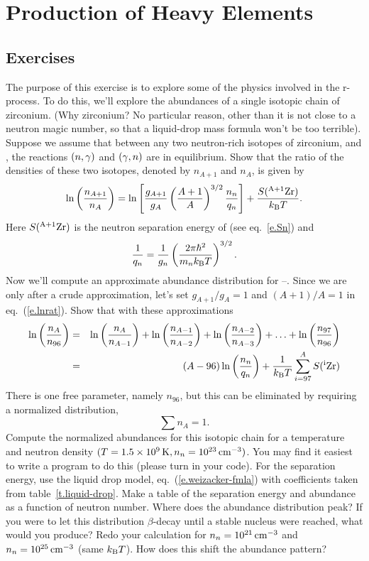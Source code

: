 \chapter{Production of Heavy Elements}

\section{Exercises}
The purpose of this exercise is to explore some of the physics involved in the r-process.  To do this, we'll explore the abundances of a single isotopic chain of zirconium.  (Why zirconium? No particular reason, other than it is not close to a neutron magic number, so that a liquid-drop mass formula won't be too terrible).  Suppose we assume that between any two neutron-rich isotopes of zirconium, \zirconium[A+1] and \zirconium[A], the reactions $(\nt,\gamma)$ and $(\gamma,\nt)$ are in equilibrium.  Show that the ratio of the densities of these two isotopes, denoted by $n_{A+1}$ and $n_{A}$, is given by
\begin{equation}\label{e.lnrat}
	\ln\left(\frac{n_{A+1}}{n_{A}}\right) = \ln\left[\frac{g_{A+1}}{g_{A}}\left(\frac{A+1}{A}\right)^{3/2}\frac{n_{\nt}}{q_{\nt}}\right] + \frac{S(\zirconium[A+1])}{\kB T}.
\end{equation}
Here $S(\zirconium[A+1])$ is the neutron separation energy of \zirconium[A+1] (see eq.~\ref{e.Sn}) and
\[
	\frac{1}{q_{\nt}} = \frac{1}{g_{\nt}}\left(\frac{2\pi\hbar^{2}}{m_{\nt}\kB T}\right)^{3/2}.
\]
Now we'll compute an approximate abundance distribution for \zirconium[96]--\zirconium[116].  Since we are only after a crude approximation, let's set $g_{A+1}/g_{A} = 1$ and $(A+1)/A = 1$ in eq.~(\ref{e.lnrat}). Show that with these approximations
\begin{eqnarray}
	\ln\left(\frac{n_{A}}{n_{96}}\right) &=& \ln\left(\frac{n_{A}}{n_{A-1}}\right)
		+ \ln\left(\frac{n_{A-1}}{n_{A-2}}\right)
		+ \ln\left(\frac{n_{A-2}}{n_{A-3}}\right) + \ldots
		+ \ln\left(\frac{n_{97}}{n_{96}}\right) \nonumber \\
		&=& (A-96)\ln\left(\frac{n_{n}}{q_{n}}\right) + \frac{1}{\kB T}\sum_{i=97}^{A} S(\zirconium[i])
\end{eqnarray}
There is one free parameter, namely $n_{96}$, but this can be eliminated by requiring a normalized distribution,
\[ \sum n_{A} = 1. \]
Compute the normalized abundances for this isotopic chain for a temperature and neutron density $(T = 1.5\ee{9}\nsp\K, n_{n} = 10^{23}\nsp\cm^{-3})$.  You may find it easiest to write a program to do this (please turn in your code). For the separation energy, use the liquid drop model, eq.~(\ref{e.weizacker-fmla}) with coefficients taken from table~\ref{t.liquid-drop}.  Make a table of the separation energy and abundance as a function of neutron number. Where does the abundance distribution peak?  If you were to let this distribution $\beta$-decay until a stable nucleus were reached, what would you produce? Redo your calculation for $n_{n} = 10^{21}\nsp\cm^{-3}$ and $n_{n} = 10^{25}\nsp\cm^{-3}$ (same $\kB T$). How does this shift the abundance pattern?

